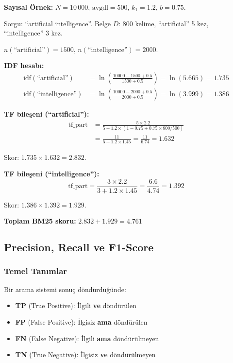 \begin{ornek}
\textbf{Say{\i}sal \"{O}rnek:} $N = 10\,000$, $\text{avgdl} = 500$, $k_1 = 1.2$, $b = 0.75$.

Sorgu: ``artificial intelligence''. Belge $D$: 800 kelime, ``artificial'' 5 kez, ``intelligence'' 3 kez.

$n(\text{``artificial''}) = 1500$, \quad $n(\text{``intelligence''}) = 2000$.

\textbf{IDF hesab{\i}:}
\begin{align*}
\text{idf}(\text{``artificial''})   &= \ln\!\left(\frac{10000 - 1500 + 0.5}{1500 + 0.5}\right) = \ln(5.665) = 1.735 \\
\text{idf}(\text{``intelligence''}) &= \ln\!\left(\frac{10000 - 2000 + 0.5}{2000 + 0.5}\right) = \ln(3.999) = 1.386
\end{align*}

\textbf{TF bile\c{s}eni (``artificial''):}
\begin{align*}
\text{tf\_part} &= \frac{5 \times 2.2}{5 + 1.2 \times (1 - 0.75 + 0.75 \times 800/500)} \\
                &= \frac{11}{5 + 1.2 \times 1.45} = \frac{11}{6.74} = 1.632
\end{align*}

Skor: $1.735 \times 1.632 = 2.832$.

\textbf{TF bile\c{s}eni (``intelligence''):}
\[
\text{tf\_part} = \frac{3 \times 2.2}{3 + 1.2 \times 1.45} = \frac{6.6}{4.74} = 1.392
\]

Skor: $1.386 \times 1.392 = 1.929$.

\textbf{Toplam BM25 skoru:} $2.832 + 1.929 = \mathbf{4.761}$
\end{ornek}


\subsection{Precision, Recall ve F1-Score}
\label{subsec:precision-recall}

\subsubsection{Temel Tan{\i}mlar}

Bir arama sistemi sonu\c{c} d\"{o}nd\"{u}rd\"{u}\u{g}\"{u}nde:
\begin{itemize}
  \item \textbf{TP} (True Positive): \.{I}lgili \textbf{ve} d\"{o}nd\"{u}r\"{u}len
  \item \textbf{FP} (False Positive): \.{I}lgisiz \textbf{ama} d\"{o}nd\"{u}r\"{u}len
  \item \textbf{FN} (False Negative): \.{I}lgili \textbf{ama} d\"{o}nd\"{u}r\"{u}lmeyen
  \item \textbf{TN} (True Negative): \.{I}lgisiz \textbf{ve} d\"{o}nd\"{u}r\"{u}lmeyen
\end{itemize}


